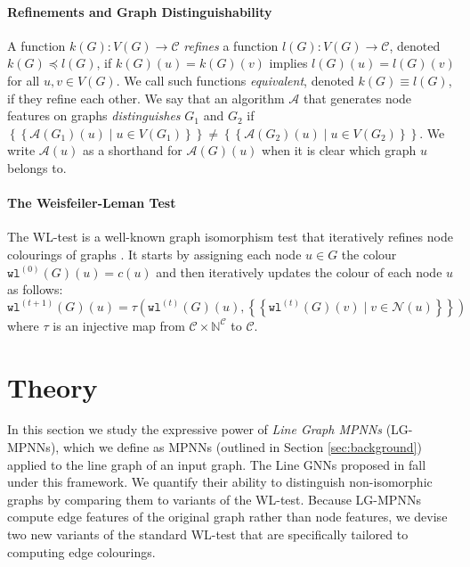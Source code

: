 \documentclass{article}
\newcommand{\multiset}[1]{\left\{\!\!\left\{#1\right\}\!\!\right\}}
\newcommand{\iter}[1]{^{(#1)}}
\newcommand{\wl}{\texttt{wl}}
\newcommand{\hash}{\tau}
\newcommand{\nbh}{\mathcal{N}}
\newcommand{\mca}{\mathcal{A}}
\newcommand{\mcc}{\mathcal{C}}
\newcommand{\mbn}{\mathbb{N}}
\begin{document}
\paragraph{Refinements and Graph Distinguishability}
A function $k(G): V(G) \rightarrow \mcc$ \emph{refines} a function $l(G): V(G) \rightarrow \mcc$, denoted $k(G) \preceq l(G)$, if $k(G)(u) = k(G)(v)$ implies $l(G)(u) = l(G)(v)$ for all $u,v\in V(G)$. We call such functions \emph{equivalent}, denoted $k(G) \equiv l(G)$, if they refine each other.
We say that an algorithm $\mca$ that generates node features on graphs \emph{distinguishes} $G_1$ and $G_2$ if $\multiset{\mca(G_1)(u) \mid u\in V(G_1)} \neq \multiset{\mca(G_2)(u) \mid u\in V(G_2)}$. We write $\mca(u)$ as a shorthand for $\mca(G)(u)$ when it is clear which graph $u$ belongs to.

\paragraph{The Weisfeiler-Leman Test}
The WL-test is a well-known graph isomorphism test that iteratively refines node colourings of graphs \cite{weisfeiler1968reduction}. It starts by assigning each node $u\in G$ the colour $\wl\iter{0}(G)(u) = c(u)$ and then iteratively updates the colour of each node $u$ as follows:
\begin{equation}
    \wl\iter{t+1}(G)(u) = \hash\left(\wl\iter{t}(G)(u), \multiset{\wl\iter{t}(G)(v) \mid v\in \nbh(u)}\right)
\end{equation}
where $\hash$ is an injective map from $\mcc\times\mbn^\mcc$ to $\mcc$. 




\section{Theory}    \label{sec:theory}


In this section we study the expressive power of \emph{Line Graph MPNNs} (LG-MPNNs), which we define as MPNNs (outlined in Section \ref{sec:background}) applied to the line graph of an input graph.
The Line GNNs proposed in \cite{cai2021line} fall under this framework.
We quantify their ability to distinguish non-isomorphic graphs by comparing them to variants of the WL-test.
Because LG-MPNNs compute edge features of the original graph rather than node features, we devise two new variants of the standard WL-test that are specifically tailored to computing edge colourings.
\end{document}
